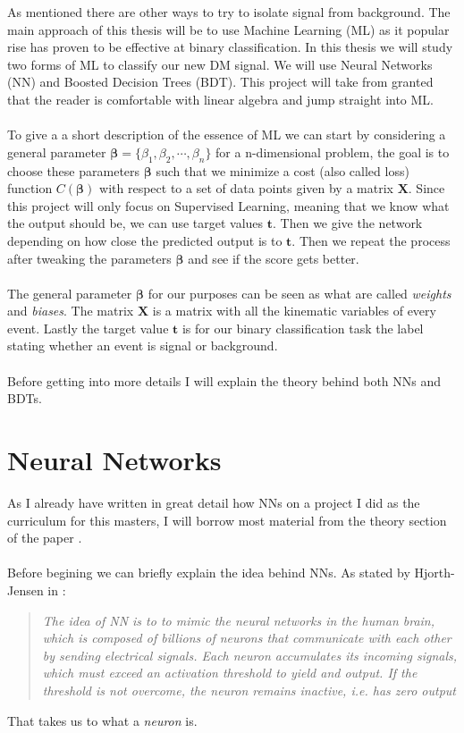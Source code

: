 \documentclass[14pt, a4paper]{book}
\begin{document}
As mentioned  there are other ways to try to isolate signal from background. The main approach of this thesis will be to use Machine Learning (ML) as it popular rise has proven to be effective at binary classification.  
In this thesis we will study two forms of ML to classify our new DM signal. We will use Neural Networks (NN) and Boosted Decision Trees (BDT). This project will take from granted that the reader is comfortable with linear algebra and jump straight into ML. \\
\\To give a a short description of the essence of ML we can start by considering a general parameter $\bm{\beta} = \{\beta_1,\beta_2,\cdots,\beta_n\}$ for a n-dimensional problem, the goal is to choose these parameters 
$\bm{\beta}$ such that we minimize a cost (also called loss) function $C(\bm{\beta})$ with respect to a set of data points given by a matrix $\mathbf{X}$. Since this project will only focus on Supervised Learning, meaning that we know what the output should be, we can use target values $\mathbf{t}$. 
Then we give the network depending on how close the predicted output is to $\bm t $. Then we repeat the process after tweaking the parameters $\bm \beta $ and see if the score gets better.\\
\\The general parameter $\bm\beta$ for our purposes can be seen as what are called \textit{weights} and \textit{biases}. The matrix $\bm X$ is a matrix with all the kinematic variables of every event. 
Lastly the target value $\bm t$ is for our binary classification task the label stating whether an event is signal or background.\\
\\Before getting into more details I will explain the theory behind both NNs and BDTs.


\graphicspath{{../../figures/}}
\newpage
\section{Neural Networks}\label{sec:theory_nn}
As I already have written in great detail how NNs on a project I did as the curriculum for this masters, I will borrow most material from the theory section of the paper .\\
\\Before begining we can briefly explain the idea behind NNs. As stated by Hjorth-Jensen in \cite{MORTYY1}:
\begin{quote}
    \textit{The idea of NN is to to mimic the neural networks in the human brain, which is composed of billions of neurons that communicate with each other by sending electrical signals. Each neuron accumulates its incoming signals, which must exceed an activation threshold to yield and output. If the threshold is not overcome, the neuron remains inactive, i.e. has zero output}
\end{quote}
That takes us to what a \textit{neuron} is.
\end{document}
